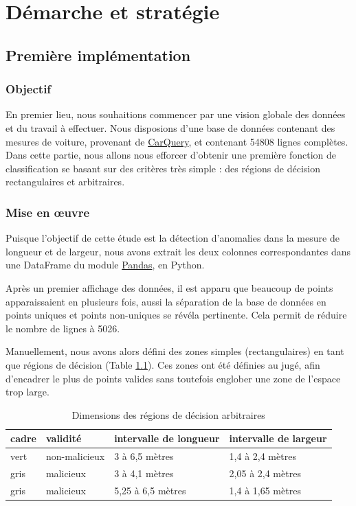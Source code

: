 \documentclass[a4paper]{report}
\begin{document}
\chapter{Démarche et stratégie}

\section{Première implémentation}

\subsection{Objectif}

En premier lieu, nous souhaitions commencer par une vision globale des données et du travail à effectuer. Nous disposions d'une base de données contenant des mesures de voiture, provenant de \href{http://www.carqueryapi.com}{CarQuery}, et contenant 54808 lignes complètes. Dans cette partie, nous allons nous efforcer d'obtenir une première fonction de classification se basant sur des critères très simple : des régions de décision rectangulaires et arbitraires.

\subsection{Mise en {\oe}uvre}

Puisque l'objectif de cette étude est la détection d'anomalies dans la mesure de longueur et de largeur, nous avons extrait les deux colonnes correspondantes dans une DataFrame du module \href{http://pandas.pydata.org}{Pandas}, en Python.

Après un premier affichage des données, il est apparu que beaucoup de points apparaissaient en plusieurs fois, aussi la séparation de la base de données en points uniques et points non-uniques se révéla pertinente. Cela permit de réduire le nombre de lignes à 5026.

Manuellement, nous avons alors défini des zones simples (rectangulaires) en tant que régions de décision (Table \ref{regions_decision_manuelles_valeurs}). Ces zones ont été définies au jugé, afin d'encadrer le plus de points valides sans toutefois englober une zone de l'espace trop large.

\begin{table}[h]
\centering
\begin{tabular}{llll}
cadre & validité & intervalle de longueur & intervalle de largeur \\
\hline
vert & non-malicieux & 3 à 6,5 mètres & 1,4 à 2,4 mètres \\
gris & malicieux & 3 à 4,1 mètres & 2,05 à 2,4 mètres \\
gris & malicieux & 5,25 à 6,5 mètres & 1,4 à 1,65 mètres \\
\end{tabular}
\caption{Dimensions des régions de décision arbitraires\label{regions_decision_manuelles_valeurs}}
\end{table}
\end{document}
